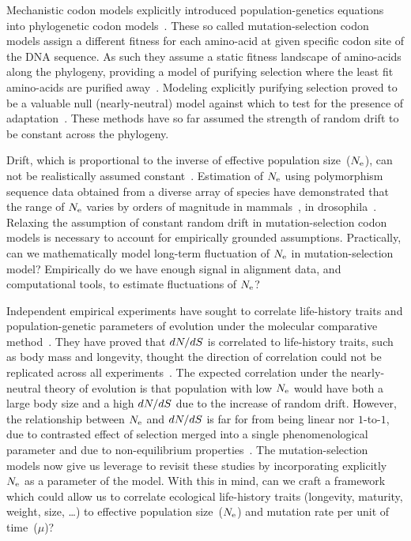 Mechanistic \gls{codon} models explicitly introduced population-genetics equations into phylogenetic \gls{codon} models~\citep{Halpern1998}.
These so called mutation-selection \gls{codon} models assign a different fitness for each amino-acid at given specific \gls{codon} site of the \acrshort{DNA} sequence.
As such they assume a static fitness landscape of amino-acids along the phylogeny, providing a model of purifying selection where the least fit amino-acids are purified away~\citep{Rodrigue2010,Rodrigue2014,Tamuri2012,Tamuri2014}.
Modeling explicitly purifying selection proved to be a valuable null (\gls{nearly-neutral}) model against which to test for the presence of adaptation~\citep{Rodrigue2016,Bloom2017}.
These methods have so far assumed the strength of random drift to be constant across the phylogeny.

Drift, which is proportional to the inverse of effective population size~($N_{\mathrm{e}}$), can not be realistically assumed constant~\citep{Ohta1992}.
Estimation of $N_{\mathrm{e}}$ using polymorphism sequence data obtained from a diverse array of species have demonstrated that the range of $N_{\mathrm{e}}$ varies by orders of magnitude in mammals~\citep{Galtier2016}, in drosophila~\citep{Benger2013,Keightley2016}.
Relaxing the assumption of constant random drift in mutation-selection \gls{codon} models is necessary to account for empirically grounded
assumptions.
Practically, can we mathematically model long-term fluctuation of $N_{\mathrm{e}}$ in mutation-selection model?
Empirically do we have enough signal in alignment data, and computational tools, to estimate fluctuations of $N_{\mathrm{e}}$?

Independent empirical experiments have sought to correlate life-history traits and population-genetic parameters of evolution under the molecular comparative method~\citep{Lartillot2011,Weber2014}.
They have proved that $dN/dS$ is correlated to life-history traits, such as body mass and longevity, thought the direction of correlation could not be replicated across all experiments~\citep{Figuet2016}.
The expected correlation under the \gls{nearly-neutral} theory of evolution is that population with low $N_{\mathrm{e}}$ would have both a large body size and a high $dN/dS$ due to the increase of random drift.
However, the relationship between $N_{\mathrm{e}}$ and $dN/dS$ is far for from being linear nor $1$-to-$1$, due to contrasted effect of selection merged into a single phenomenological parameter and due to non-equilibrium properties~\citep{Jones2016}.
The mutation-selection models now give us leverage to revisit these studies by incorporating explicitly $N_{\mathrm{e}}$ as a parameter of the model.
With this in mind, can we craft a framework which could allow us to correlate ecological life-history traits (longevity, maturity, weight, size, \ldots) to effective population size~($N_{\mathrm{e}}$) and mutation rate per unit of time~($\mu$)?

